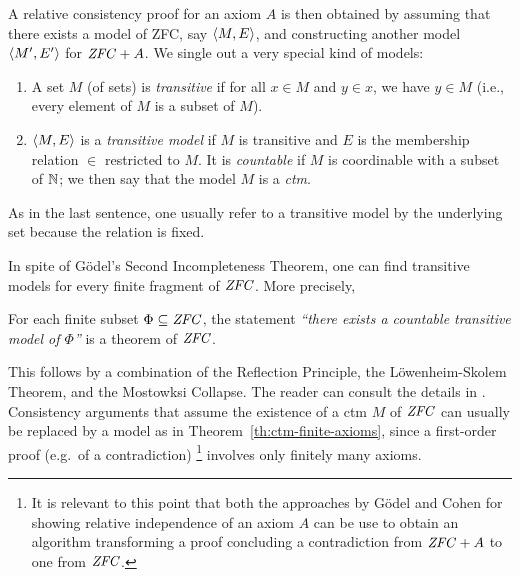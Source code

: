 A relative consistency proof for an axiom $A$ is then obtained by
assuming that there exists a model of ZFC, say $\langle M,E\rangle$, and
constructing another model $\langle M',E'\rangle$ for $\mathit{ZFC} + A$. We single
out a very special kind of models:
%
\begin{definition}\label{def:transitive-model}
  \begin{enumerate}
  \item A set $M$ (of sets) is \emph{transitive} if for all $x\in M$ and 
    $y\in x$, we have $y\in M$ (i.e., every element of $M$ is a subset
    of $M$).
  \item $\langle M,E\rangle$ is a \emph{transitive model} if $M$ is transitive
     and  $E$ is the membership relation $\in$ restricted to
    $M$. It is \emph{countable} if $M$ is coordinable with a subset of
    $\mathbb{N}$; we then say that the model  $M$ is a \emph{ctm}. 
  \end{enumerate}
\end{definition}
%
\noindent As in the last sentence, one usually refer to a transitive
model by the underlying set because the relation is fixed.

In spite of G\"odel's Second Incompleteness Theorem, one can find
transitive models for every finite fragment of $\mathit{ZFC}$. More precisely,
%
\begin{theorem}\label{th:ctm-finite-axioms}
  For each finite subset
  $\Phi\subseteq \mathit{ZFC}$, the statement \emph{``there exists a countable
    transitive model of $\Phi$''} is a theorem of $\mathit{ZFC}$.
\end{theorem}
%
This follows by a combination of the Reflection Principle, the
L\"owenheim-Skolem Theorem, and the Mostowksi Collapse. The reader can
consult the details in \cite{kunen2011set}. Consistency arguments that
assume the existence of a ctm $M$ of $\mathit{ZFC}$ can usually be replaced by
a model as in Theorem~\ref{th:ctm-finite-axioms}, since a first-order
proof (e.g.\ of a contradiction)%
\footnote{It is relevant to this point that 
  both the approaches by G\"odel and Cohen for showing
  relative independence of an axiom $A$ 
  can be use to obtain an algorithm transforming a proof
  concluding a contradiction from $\mathit{ZFC}+A$ to one from $\mathit{ZFC}$.}
involves only finitely many axioms.

